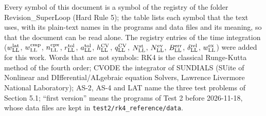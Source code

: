 \documentclass[
  10pt,
]{article}
\begin{document}
Every symbol of this document is a symbol of the registry of the folder
Revision\_SuperLoop (Hard Rule 5); the table lists each symbol that the
text uses, with its plain-text names in the programs and data files and
its meaning, so that the document can be read alone. The registry
entries of the time integration (\(w^{\rm lat}_{\rm LL}\),
\(w^{\rm cmp}_{\rm LL}\), \(n^{\rm cpx}_{\rm LL}\),
\(r^{\rm tol}_{\rm LL}\), \(a^{\rm tol}_{\rm LL}\),
\(h^{\rm CV}_{\rm LL}\), \(q^{\rm CV}_{\rm LL}\),
\(N^{\rm st}_{\rm LL}\), \(N^{\rm ev}_{\rm LL}\),
\(B^{\rm err}_{\rm LL}\), \(\delta^{\rm rel}_{\rm LL}\),
\(w^{\rm ex}_{\rm LL}\)) were added for this work. Words that are not
symbols: RK4 is the classical Runge-Kutta method of the fourth order;
CVODE the integrator of SUNDIALS (SUite of Nonlinear and
DIfferential/ALgebraic equation Solvers, Lawrence Livermore National
Laboratory); AS-2, AS-4 and LAT name the three test problems of Section
5.1; ``first version'' means the programs of Test 2 before 2026-11-18,
whose data files are kept in \texttt{test2/rk4\_reference/data}.
\end{document}
